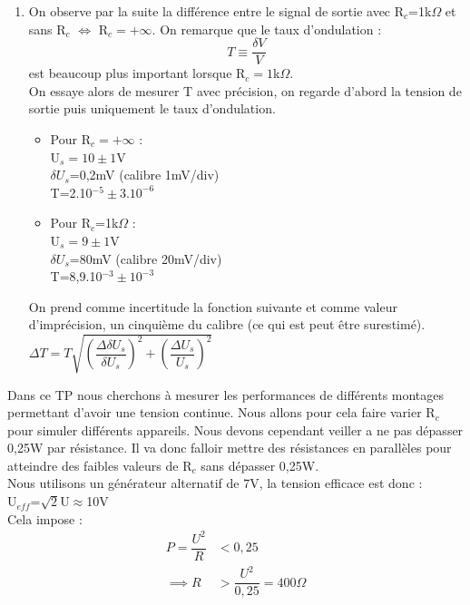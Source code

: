 \documentclass[12pt,a4paper]{article}
\begin{document}
\begin{enumerate}
\item On observe par la suite la différence entre le signal de sortie avec R$_{c}$=1k$\Omega$ et sans R$_{c}$ $\iff$ R$_{c}=+ \infty$. On remarque que le taux d'ondulation : \[T\equiv \dfrac{\delta V}{V} \] est beaucoup plus important lorsque R$_{c}=1$k$\Omega$. \\
On essaye alors de mesurer T avec précision, on regarde d'abord la tension de sortie puis uniquement le taux d'ondulation.
\begin{multicols}{2}
\begin{itemize}
\item Pour R$_{c}=+ \infty$ :\\
U$_{s}=10\pm1$V \\
$\delta U_{s}$=0,2mV (calibre 1mV/div)\\
T=2.10$^{-5}\pm3.10^{-6}$
\item Pour R$_{c}$=1k$\Omega$ : \\
U$_{s}=9\pm1$V\\
$\delta U_{s}$=80mV (calibre 20mV/div)\\
T=8,9.10$^{-3}\pm10^{-3}$
\end{itemize}
\end{multicols}
On prend comme incertitude la fonction suivante et comme valeur d'imprécision, un cinquième du calibre (ce qui est peut être surestimé). \\
$\Delta T=T\sqrt {\left( \dfrac {\Delta \delta U_{s}} {\delta U_{s}}\right) ^{2}+\left( \dfrac {\Delta U_{s}} {U_{s}}\right) ^{2}}$
\end{enumerate}
\vspace{1cm}
Dans ce TP nous cherchons à mesurer les performances de différents montages permettant d'avoir une tension continue. Nous allons pour cela faire varier R$_{c}$ pour simuler différents appareils. Nous devons cependant veiller a ne pas dépasser 0,25W par résistance. Il va donc falloir mettre des résistances en parallèles pour atteindre des faibles valeurs de R$_{c}$ sans dépasser 0,25W.
\\Nous utilisons un générateur alternatif de 7V, la tension efficace est donc :\\ U$_{eff}$=$\sqrt{2}$U$\approx$10V\\
Cela impose :
\begin{align*}
P=\dfrac{U^{2}}{R}&<0,25\\
\implies R&>\dfrac{U^{2}}{0,25}=400\Omega
\end{align*}
\end{document}
